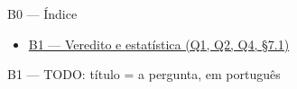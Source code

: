 \documentclass{beamer}
\begin{document}
\miniframesoff

\begin{frame}[noframenumbering]{B0 --- Índice}
    \hypertarget{b0}{}
    \begin{itemize}
        \item \hyperlink{b1}{B1 --- Veredito e estatística (Q1, Q2, Q4, §7.1)}
    \end{itemize}
\end{frame}

\begin{frame}[noframenumbering]{B1 --- TODO: título = a pergunta, em português}
    \hypertarget{b1}{}

    \hyperlink{b0}{}
\end{frame}

\end{document}
